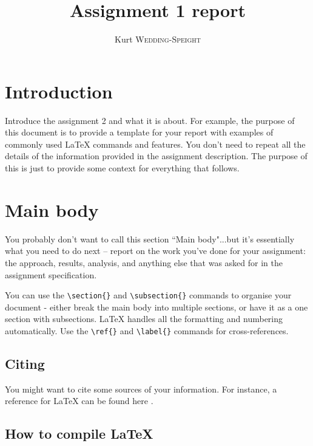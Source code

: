 \documentclass[12pt]{article}
\title{Assignment 1 report}
\author{Kurt \textsc{Wedding-Speight}}
\begin{document}
\maketitle


\section{Introduction}

Introduce the assignment 2 and what it is about. For example, the purpose of this document is to provide a template for your report with examples of commonly used \LaTeX{} commands and features.  You don't need to repeat all the details of the information provided in the assignment description.  The purpose of this is just to provide some context for everything that follows.   

\section{Main body}

You probably don't want to call this section ``Main body"...but it's essentially what you need to do next --  report on the work you've done for your assignment: the approach, results, analysis, and anything else that was asked for in the assignment specification.  

You can use the \verb$\section{}$ and \verb$\subsection{}$ commands to organise your document - either break the main body into multiple sections, or have it as a one section with subsections.   \LaTeX{} handles all the formatting and numbering automatically. Use the \verb$\ref{}$ and \verb$\label{}$ commands for cross-references.  

\subsection{Citing}

You might want to cite some sources of your information.  For instance, a reference for \LaTeX{} can be found here \cite{latexcompanion}.

\subsection{How to compile \LaTeX{}}
\end{document}

